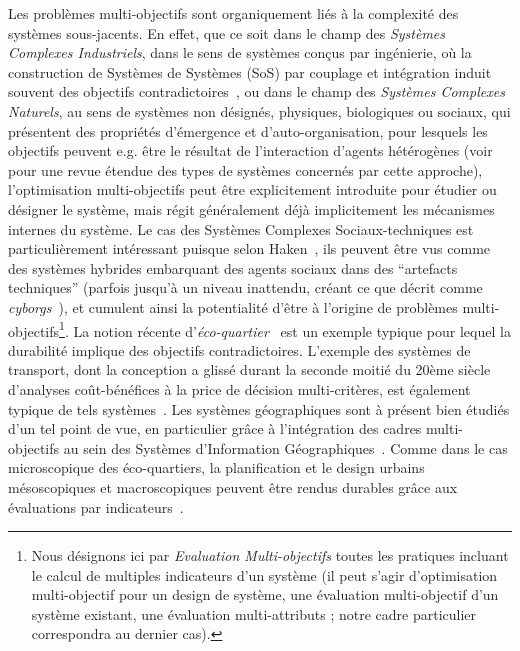 {Les problèmes multi-objectifs sont organiquement liés à la complexité des systèmes sous-jacents. En effet, que ce soit dans le champ des \emph{Systèmes Complexes Industriels}, dans le sens de systèmes conçus par ingénierie, où la construction de Systèmes de Systèmes (SoS) par couplage et intégration induit souvent des objectifs contradictoires~\cite{marler2004survey}, ou dans le champ des \emph{Systèmes Complexes Naturels}, au sens de systèmes non désignés, physiques, biologiques ou sociaux, qui présentent des propriétés d'émergence et d'auto-organisation, pour lesquels les objectifs peuvent e.g. être le résultat de l'interaction d'agents hétérogènes (voir~\cite{newman2011complex} pour une revue étendue des types de systèmes concernés par cette approche), l'optimisation multi-objectifs peut être explicitement introduite pour étudier ou désigner le système, mais régit généralement déjà implicitement les mécanismes internes du système. Le cas des Systèmes Complexes Sociaux-techniques est particulièrement intéressant puisque selon Haken~\cite{haken2003face}, ils peuvent être vus comme des systèmes hybrides embarquant des agents sociaux dans des ``artefacts techniques'' (parfois jusqu'à un niveau inattendu, créant ce que  décrit comme \emph{cyborgs}~\cite{picon2013smart}), et cumulent ainsi la potentialité d'être à l'origine de problèmes multi-objectifs\footnote{Nous désignons ici par \emph{Evaluation Multi-objectifs} toutes les pratiques incluant le calcul de multiples indicateurs d'un système (il peut s'agir d'optimisation multi-objectif pour un design de système, une évaluation multi-objectif d'un système existant, une évaluation multi-attributs ; notre cadre particulier correspondra au dernier cas).}. La notion récente d'\emph{éco-quartier}~\cite{souami2012ecoquartiers} est un exemple typique pour lequel la durabilité implique des objectifs contradictoires. L'exemple des systèmes de transport, dont la conception a glissé durant la seconde moitié du 20ème siècle d'analyses coût-bénéfices à la price de décision multi-critères, est également typique de tels systèmes~\cite{bavoux2005geographie}. Les systèmes géographiques sont à présent bien étudiés d'un tel point de vue, en particulier grâce à l'intégration des cadres multi-objectifs au sein des Systèmes d'Information Géographiques~\cite{carver1991integrating}. Comme dans le cas microscopique des éco-quartiers, la planification et le design urbains mésoscopiques et macroscopiques peuvent être rendus durables grâce aux évaluations par indicateurs~\cite{jegou2012evaluation}.
}



